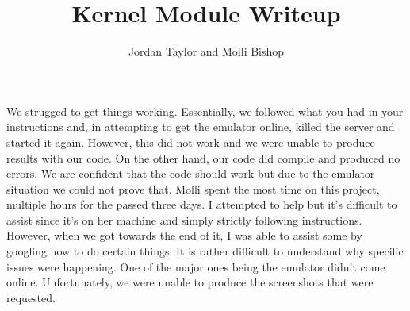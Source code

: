 \documentclass[12pt,letterpaper,notitlepage]{report}
\title{Kernel Module Writeup}
\author{Jordan Taylor and Molli Bishop}
\begin{document}
\maketitle
\begin{quad}

We strugged to get things working. Essentially, we followed what you had in your instructions and, in attempting to get the emulator online, killed the server and started it again. However, this did not work and we were unable to produce results with our code. On the other hand, our code did compile and produced no errors. We are confident that the code should work but due to the emulator situation we could not prove that. Molli spent the most time on this project, multiple hours for the passed three days. I attempted to help but it's difficult to assist since it's on her machine and simply strictly following instructions. However, when we got towards the end of it, I was able to assist some by googling how to do certain things. It is rather difficult to understand why specific issues were happening. One of the major ones being the emulator didn't come online. Unfortunately, we were unable to produce the screenshots that were requested.
\newline
\end{quad}
\end{document}
